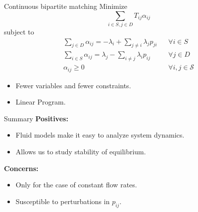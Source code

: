     \begin{frame}{Continuous bipartite matching}
    Minimize
    \begin{equation*}
    \sum_{i \in S, j \in D} T_{ij}\alpha_{ij}
    \end{equation*}
    subject to
    \begin{align*}
        \sum_{j \in D}\alpha_{ij} = - \lambda_i + \sum_{j \neq i}\lambda_j p_{ji} && \forall i \in S \\
        \sum_{i \in S}\alpha_{ij} = \lambda_j - \sum_{i \neq j}\lambda_i p_{ij} && \forall j \in D \\
        \alpha_{ij} \geq 0 && \forall{i,j} \in \mathcal{S}
    \end{align*}
    \pause
    \begin{itemize}
        \item Fewer variables and fewer constraints.
        \pause
        \item Linear Program.
    \end{itemize}
    \end{frame}

    \begin{frame}{Summary}
    	\textbf{Positives:}
    	\begin{itemize}
    		\item Fluid models make it easy to analyze system dynamics.
    		\item Allows us to study stability of equilibrium.
    	\end{itemize}
    		\vspace{0.1in}
    		\pause
    	\textbf{Concerns:}
    	\begin{itemize}
    		\item \alert{Only for the case of constant flow rates.}
    		\item \alert{Susceptible to perturbations in $p_{ij}$.}
    	\end{itemize}
    \end{frame}
